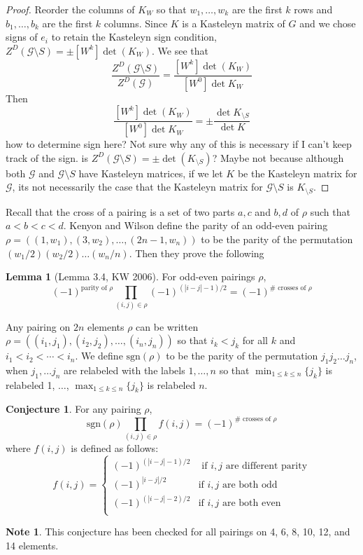 \documentclass[11pt]{amsart}
\theoremstyle{definition}
\newtheorem*{conj*}{Conjecture}
\newtheorem*{lemma*}{Lemma}
\newtheorem*{note*}{Note}
\newcommand{\sgn}{\text{sgn}}
\begin{document}
\begin{proof}
 Reorder the columns of $K_{W}$ so that $w_1, \ldots, w_k$ are the first $k$ rows and $b_1, \ldots, b_k$ are the first $k$ columns. Since $K$ is a Kasteleyn matrix of $G$ and we chose signs of $e_i$ to retain the Kasteleyn sign condition, $Z^{D}(\mathcal{G} \setminus S) = \pm [W^{k}] \det(K_{W})$. 
We see that
$$\dfrac{ Z^{D}(\mathcal{G} \setminus S)}{Z^{D}(\mathcal{G})} = \dfrac{ [W^{k}] \det(K_{W}) }{[W^{0}] \det K_{W}}$$
Then
$$ \dfrac{ [W^{k}] \det(K_{W}) }{[W^{0}] \det K_{W}} = \pm \dfrac{ \det K_{\setminus S} }{ \det K }$$
how to determine sign here?
Not sure why any of this is necessary if I can't keep track of the sign. 
is $Z^{D}(\mathcal{G} \setminus S) = \pm \det (K_{\setminus S})$? Maybe not because although both $\mathcal{G}$ and $\mathcal{G} \setminus S$ have Kasteleyn matrices, if we let $K$ be the Kasteleyn matrix for $\mathcal{G}$, its not necessarily the case that the Kasteleyn matrix for $\mathcal{G} \setminus S$ is $K_{\setminus S}$. 

\end{proof}

Recall that the cross of a pairing is a set of two parts ${a, c}$ and ${b, d}$ of $\rho$ such that $a < b < c < d$. 
Kenyon and Wilson define the parity of an odd-even pairing $\rho = ((1, w_1), (3, w_2), \ldots, (2n-1, w_n))$ to be the parity of the permutation $(w_1/2)(w_2/2)\ldots(w_n/n)$. Then they prove the following

\begin{lemma*}[Lemma 3.4, KW 2006]
For odd-even pairings $\rho$, 
$$(-1)^{\text{parity of } \rho} \prod\limits_{(i, j) \in \rho} (-1)^{(|i-j|-1)/2} = (-1)^{\# \text{ crosses of } \rho}$$
\end{lemma*}

Any pairing on $2n$ elements $\rho$ can be written $\rho = ((i_1, j_1), (i_2, j_2), \ldots, (i_n, j_n))$ so that $i_k < j_k$ for all $k$ and $i_1 < i_2 < \cdots < i_n$. We define $\sgn(\rho)$ to be the parity of the permutation $j_1 j_2 \ldots j_n$, when $j_1, \ldots j_n$ are relabeled with the labels $1, \ldots, n$ so that $\min_{1 \leq k \leq n} \{j_{k} \}$ is relabeled 1, $\ldots$, $\max_{1 \leq k \leq n} \{j_{k} \}$ is relabeled $n$.

\begin{conj*}
For any pairing $\rho$, 
$$\sgn(\rho) \prod\limits_{(i, j) \in \rho} f(i, j) =  (-1)^{\# \text{ crosses of } \rho}$$
where $f(i, j)$ is defined as follows: 
$$f(i, j) = \begin{cases} 
(-1)^{(|i-j| -1)/2} & \mbox{ if $i, j$ are different parity} \\
(-1)^{|i-j|/2} & \mbox{if $i, j$ are both odd} \\
(-1)^{(|i-j|-2)/2} & \mbox{if $i, j$ are both even} \\
\end{cases}$$
\end{conj*}

\begin{note*}
This conjecture has been checked for all pairings on 4, 6, 8, 10, 12, and 14 elements. 
\end{note*}
\end{document}
